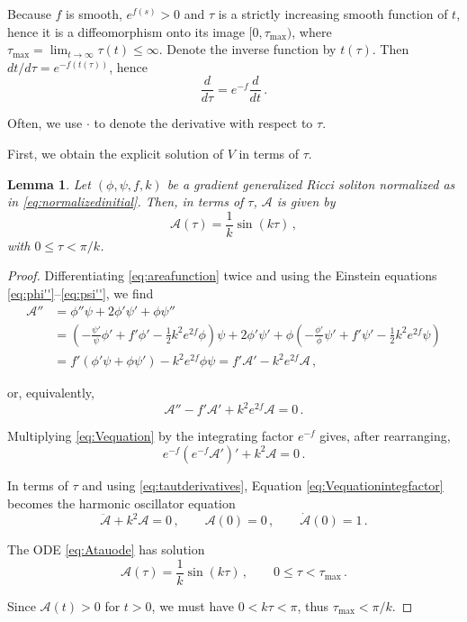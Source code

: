 \documentclass[12pt,a4paper,reqno]{amsart}
\theoremstyle{plain}
\newtheorem{lemma}[theorem]{Lemma}
\theoremstyle{remark}
\numberwithin{equation}{section}
\newcommand{\cA}{\mathcal{A}}
\begin{document}
Because $f$ is smooth, $e^{f(s)}>0$ and $\tau$ is a strictly increasing smooth function of $t$, hence it is a diffeomorphism onto its image $[0,\tau_{\max})$, where $\tau_{\max} = \lim_{t\to\infty}\tau(t) \le \infty$. Denote the inverse function by $t(\tau)$. Then $dt/d\tau=e^{-f(t(\tau))}$, hence
\begin{equation}\label{eq:tautderivatives}
\frac{d}{d\tau}=e^{-f}\frac{d}{dt} \,.
\end{equation}

Often, we use $\cdot$ to denote the derivative with respect to $\tau$.

First, we obtain the explicit solution of $V$ in terms of $\tau$.

\begin{lemma}\label{lemma:Atau}
Let $(\phi,\psi,f,k)$ be a gradient generalized Ricci soliton normalized as in \eqref{eq:normalizedinitial}. Then, in terms of $\tau$, $\cA$ is given by
\begin{equation}\label{eq:Atauexplicit}
\cA(\tau) = \frac{1}{k}\sin(k\tau) \,,
\end{equation}
with $0\le\tau<\pi/k$.
\end{lemma}

\begin{proof}
Differentiating \eqref{eq:areafunction} twice and using the Einstein equations \eqref{eq:phi''}--\eqref{eq:psi''}, we find
\begin{align*}
\cA'' &= \phi''\psi + 2\phi'\psi' + \phi\psi'' \\
&= \left(-\frac{\psi'}{\psi} \phi' + f' \phi' - \frac{1}{2}k^2 e^{2f} \phi\right)\psi + 2\phi'\psi' + \phi\left(-\frac{\phi'}{\phi} \psi' + f' \psi' - \frac{1}{2}k^2 e^{2f} \psi\right) \\
&= f' (\phi'\psi + \phi\psi') - k^2 e^{2f} \phi\psi = f'\cA' - k^2 e^{2f} \cA \,,
\end{align*}

or, equivalently,
\begin{equation}\label{eq:Vequation}
\cA'' - f'\cA' + k^2 e^{2f} \cA = 0 \,.
\end{equation}

Multiplying \eqref{eq:Vequation} by the integrating factor $e^{-f}$ gives, after rearranging,
\begin{equation}\label{eq:Vequationintegfactor}
e^{-f}(e^{-f}\cA')' + k^2 \cA = 0 \,.
\end{equation}

In terms of $\tau$ and using \eqref{eq:tautderivatives}, Equation \eqref{eq:Vequationintegfactor} becomes the harmonic oscillator equation
\begin{equation}\label{eq:Atauode}
\ddot{\cA} + k^2 \cA = 0 \,, \qquad \cA(0) = 0 \,, \qquad \dot{\cA}(0) = 1 \,.
\end{equation}

The ODE \eqref{eq:Atauode} has solution
\begin{equation*}
\cA(\tau) = \frac{1}{k}\sin(k\tau) \,, \qquad 0 \le \tau < \tau_{\max} \,.
\end{equation*}

Since $\cA(t)>0$ for $t>0$, we must have $0<k\tau<\pi$, thus $\tau_{\max}<\pi/k$.
\end{proof}
\end{document}
